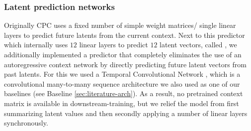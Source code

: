\subsubsection{Latent prediction networks}
Originally CPC uses a fixed number of simple weight matrices/ single linear layers to predict future latents from the current context. Next to this predictor which internally uses $12$ linear layers to predict $12$ latent vectors, called , we additionally implemented a predictor that completely eliminates the use of an autoregressive context network by directly predicting future latent vectors from past latents. For this we used a Temporal Convolutional Network \autocite{bai2018empirical}, which is a convolutional many-to-many sequence architecture we also used as one of our baselines (see Baseline \autoref{sec:literature-arch}). As a result, no pretrained context matrix is available in downstream-training, but we relief the model from first summarizing latent values and then secondly applying a number of linear layers synchronously.

